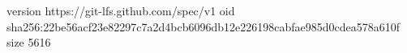 version https://git-lfs.github.com/spec/v1
oid sha256:22be56acf23e82297c7a2d4bcb6096db12e226198cabfae985d0cdea578a610f
size 5616
